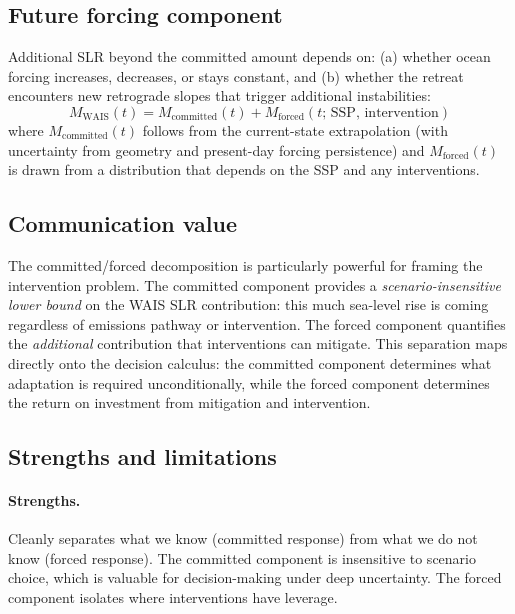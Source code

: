 \documentclass[11pt]{article}
\newcommand{\WAIS}{\text{WAIS}}
\begin{document}
\subsection{Future forcing component}

Additional SLR beyond the committed amount depends on: (a) whether ocean forcing increases, decreases, or stays constant, and (b) whether the retreat encounters new retrograde slopes that trigger additional instabilities:
\begin{equation}
  M_{\WAIS}(t) = M_{\text{committed}}(t) + M_{\text{forced}}(t;\, \text{SSP},\, \text{intervention})
  \label{eq:committed_forced}
\end{equation}
where $M_{\text{committed}}(t)$ follows from the current-state extrapolation (with uncertainty from geometry and present-day forcing persistence) and $M_{\text{forced}}(t)$ is drawn from a distribution that depends on the SSP and any interventions.

\subsection{Communication value}

The committed/forced decomposition is particularly powerful for framing the intervention problem.  The committed component provides a \emph{scenario-insensitive lower bound} on the WAIS SLR contribution: this much sea-level rise is coming regardless of emissions pathway or intervention.  The forced component quantifies the \emph{additional} contribution that interventions can mitigate.  This separation maps directly onto the decision calculus: the committed component determines what adaptation is required unconditionally, while the forced component determines the return on investment from mitigation and intervention.

\subsection{Strengths and limitations}

\paragraph{Strengths.}  Cleanly separates what we know (committed response) from what we do not know (forced response).  The committed component is insensitive to scenario choice, which is valuable for decision-making under deep uncertainty.  The forced component isolates where interventions have leverage.
\end{document}

